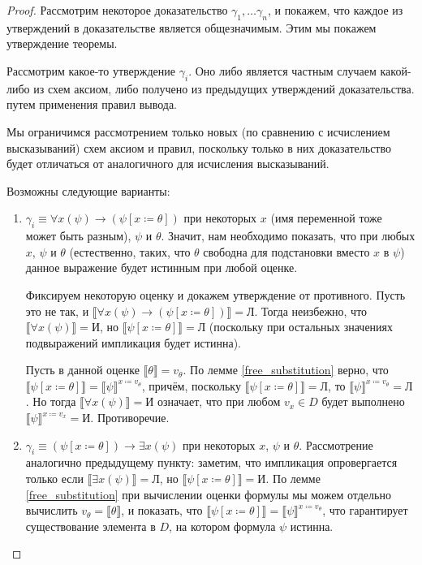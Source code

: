 \begin{proof}
Рассмотрим некоторое доказательство $\gamma_1, \dots \gamma_n$, и покажем, что
каждое из утверждений в доказательстве является общезначимым. Этим мы покажем 
утверждение теоремы.

Рассмотрим какое-то утверждение $\gamma_i$. Оно либо является частным случаем
какой-либо из схем аксиом, либо получено из предыдущих утверждений доказательства.
путем применения правил вывода.

Мы ограничимся рассмотрением только новых (по сравнению с исчислением высказываний)
схем аксиом и правил, поскольку только в них доказательство будет отличаться
от аналогичного для исчисления высказываний.

Возможны следующие варианты:
\begin{enumerate}
\item $\gamma_i \equiv \forall{x}(\psi) \rightarrow (\psi[x \coloneqq  \theta])$ при 
некоторых $x$ (имя переменной тоже может быть разным), $\psi$ и $\theta$. 
Значит, нам необходимо показать, что при любых $x$, $\psi$ и $\theta$ 
(естественно, таких, что $\theta$ свободна для подстановки вместо $x$ в $\psi$) 
данное выражение будет истинным при любой оценке.

Фиксируем некоторую оценку и докажем утверждение от противного. 
Пусть это не так, и 
$\llbracket \forall{x}(\psi)\rightarrow(\psi[x \coloneqq  \theta])\rrbracket = \texttt{Л}$.
Тогда неизбежно, что $\llbracket \forall{x}(\psi) \rrbracket = \texttt{И}$, но
$\llbracket \psi[x\coloneqq \theta] \rrbracket = \texttt{Л}$ (поскольку при остальных значениях
подвыражений импликация будет истинна). 

Пусть в данной оценке $\llbracket\theta\rrbracket=v_\theta$. 
По лемме \ref{free_substitution} верно, что 
$\llbracket \psi[x\coloneqq \theta] \rrbracket = \llbracket\psi\rrbracket^{x\coloneqq v_\theta}$,
причём, поскольку $\llbracket \psi[x\coloneqq \theta] \rrbracket = \texttt{Л}$, то
$\llbracket\psi\rrbracket^{x\coloneqq v_\theta} = \texttt{Л}$.
Но тогда $\llbracket \forall{x}(\psi) \rrbracket = \texttt{И}$ означает, что 
при любом $v_x \in D$ будет выполнено $\llbracket \psi \rrbracket^{x \coloneqq  v_x} = \texttt{И}$. 
Противоречие.

\item $\gamma_i \equiv (\psi[x \coloneqq  \theta]) \rightarrow \exists{x}(\psi)$ при некоторых
$x$, $\psi$ и $\theta$. Рассмотрение аналогично предыдущему пункту: заметим, что импликация
опровергается только если $\llbracket \exists{x}(\psi) \rrbracket = \texttt{Л}$, но
$\llbracket \psi[x\coloneqq \theta] \rrbracket = \texttt{И}$. По лемме 
\ref{free_substitution} при вычислении оценки формулы мы можем отдельно вычислить
$v_\theta = \llbracket\theta\rrbracket$, и показать, что 
$\llbracket \psi[x\coloneqq \theta] \rrbracket = \llbracket\psi\rrbracket^{x\coloneqq v_\theta}$, что 
гарантирует существование элемента в $D$, на котором формула $\psi$ истинна.


\end{enumerate}
\end{proof}
